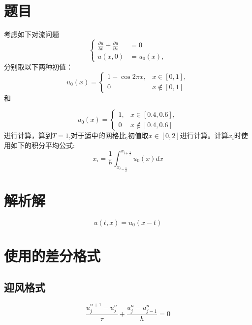 \documentclass[12pt]{article}
\theoremstyle{remark}
\begin{document}
\title{\textbf{}} 
\author{}
\maketitle
\large
\section{题目}
考虑如下对流问题
\begin{equation}
\begin{cases}
\frac{\partial u}{\partial t}+\frac{\partial u}{\partial x}&=0\\
u(x,0)&=u_0(x),
\end{cases}
\end{equation}
分别取以下两种初值：
\begin{equation}
u_0(x)=\begin{cases}
1-\cos2\pi x,&x \in [0,1],\\
0&x \notin [0,1]
\end{cases}
\end{equation}
和

\begin{equation}
u_0(x)=\begin{cases}
1,&x \in [0.4,0.6],\\
0&x \notin [0.4,0.6]
\end{cases}
\end{equation}
进行计算，算到$T=1$,对于适中的网格比,初值取$x \in [0,2]$进行计算。计算$x_i$时使用如下的积分平均公式:
\begin{equation}
x_i=\frac{1}{h}\int_{x_{i-\frac{1}{2}}}^{x_{i+\frac{1}{2}}}u_0(x)dx
\end{equation}
\section{解析解}
\begin{equation}
u(t,x)=u_0(x-t)
\end{equation}
\section{使用的差分格式}
\subsection{迎风格式}
\begin{equation}
\frac{u_j^{n+1}-u_j^n}{\tau}+\frac{u_j^n-u_{j-1}^n}{h}=0
\end{equation}
\end{document}
